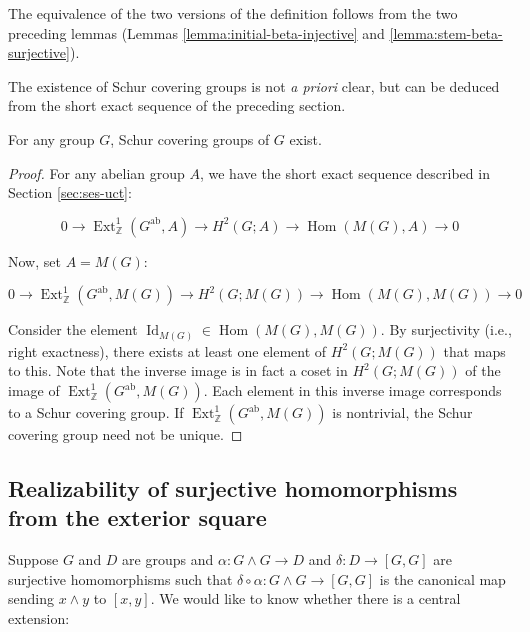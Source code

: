 The equivalence of the two versions of the definition follows from the
two preceding lemmas (Lemmas \ref{lemma:initial-beta-injective} and
\ref{lemma:stem-beta-surjective}).

The existence of Schur covering groups is not {\em a priori} clear,
but can be deduced from the short exact sequence of the preceding
section. 

\begin{theorem}\label{thm:schur-covering-groups-exist}
  For any group $G$, Schur covering groups of $G$ exist.
\end{theorem}

\begin{proof}
  For any abelian group $A$, we have the short exact sequence
  described in Section \ref{sec:ses-uct}:

  \begin{equation*}
    0 \to \operatorname{Ext}^1_{\mathbb{Z}}(G^{\operatorname{ab}},A) \to H^2(G;A) \to \operatorname{Hom}(M(G),A) \to 0
  \end{equation*}
  
  Now, set $A = M(G)$:

  \begin{equation*}
    0 \to \operatorname{Ext}^1_{\mathbb{Z}}(G^{\operatorname{ab}},M(G)) \to H^2(G;M(G)) \to \operatorname{Hom}(M(G),M(G)) \to 0
  \end{equation*}
  
  Consider the element $\operatorname{Id}_{M(G)} \in
  \operatorname{Hom}(M(G),M(G))$. By surjectivity (i.e., right
  exactness), there exists at least one element of $H^2(G;M(G))$ that
  maps to this. Note that the inverse image is in fact a coset in
  $H^2(G;M(G))$ of the image of
  $\operatorname{Ext}^1_{\mathbb{Z}}(G^{\operatorname{ab}},M(G))$. Each
  element in this inverse image corresponds to a Schur covering
  group. If
  $\operatorname{Ext}^1_{\mathbb{Z}}(G^{\operatorname{ab}},M(G))$ is
  nontrivial, the Schur covering group need not be unique.
\end{proof}

\subsection{Realizability of surjective homomorphisms from the exterior square}

Suppose $G$ and $D$ are groups and $\alpha:G \wedge G \to D$ and
$\delta:D \to [G,G]$ are surjective homomorphisms such that $\delta
\circ \alpha:G \wedge G \to [G,G]$ is the canonical map sending $x
\wedge y$ to $[x,y]$. We would like to know whether there is a central
extension:

